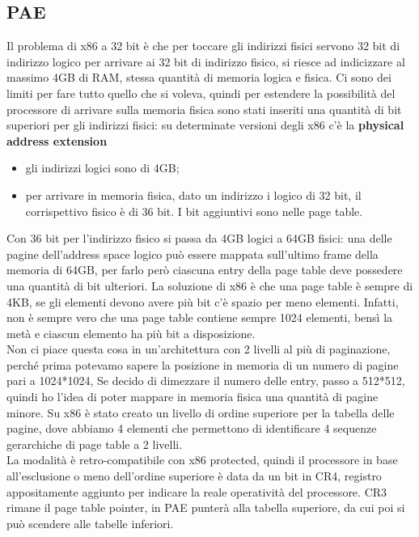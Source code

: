 \documentclass[12pt, oneside]{extbook}
\begin{document}
\subsection{PAE}
Il problema di x86 a 32 bit è che per toccare gli indirizzi fisici servono 32 bit di indirizzo logico per arrivare ai 32 bit di indirizzo fisico, si riesce ad indicizzare al massimo 4GB di RAM, stessa quantità di memoria logica e fisica. Ci sono dei limiti per fare tutto quello che si voleva, quindi per estendere la possibilità del processore di arrivare sulla memoria fisica sono stati inseriti una quantità di bit superiori per gli indirizzi fisici: su determinate versioni degli x86 c'è la \textbf{physical address extension}
\begin{itemize}
\item gli indirizzi logici sono di 4GB;
\item per arrivare in memoria fisica, dato un indirizzo i logico di 32 bit, il corrispettivo fisico è di 36 bit. I bit aggiuntivi sono nelle page table.
\end{itemize}
Con 36 bit per l'indirizzo fisico si passa da 4GB logici a 64GB fisici: una delle pagine dell'address space logico può essere mappata sull'ultimo frame della memoria di 64GB, per farlo però ciascuna entry della page table deve possedere una quantità di bit ulteriori. La soluzione di x86 è che una page table è sempre di 4KB, se gli elementi devono avere più bit c'è spazio per meno elementi. Infatti, non è sempre vero che una page table contiene sempre 1024 elementi, bensì la metà e ciascun elemento ha più bit a disposizione.\\ Non ci piace questa cosa in un'architettura con 2 livelli al più di paginazione, perché prima potevamo sapere la posizione in memoria di un numero di pagine pari a 1024*1024, Se decido di dimezzare il numero delle entry, passo a 512*512, quindi ho l'idea di poter mappare in memoria fisica una quantità di pagine minore. Su x86 è stato creato un livello di ordine superiore per la tabella delle pagine, dove abbiamo 4 elementi che permettono di identificare 4 sequenze gerarchiche di page table a 2 livelli.\\ La modalità è retro-compatibile con x86 protected, quindi il processore in base all'esclusione o meno dell'ordine superiore è data da un bit in CR4, registro appositamente aggiunto per indicare la reale operatività del processore. CR3 rimane il page table pointer, in PAE punterà alla tabella superiore, da cui poi si può scendere alle tabelle inferiori.
\end{document}

